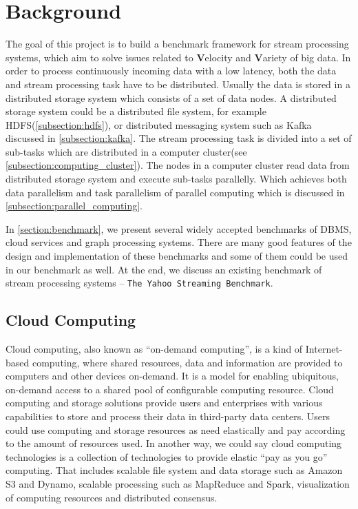 \chapter{Background}
The goal of this project is to build a benchmark framework for stream processing systems, which aim to solve issues related to \textbf{V}elocity and \textbf{V}ariety of big data\cite{GameChanger}. In order to process continuously incoming data with a low latency, both the data and stream processing task have to be distributed. Usually the data is stored in a distributed storage system which consists of a set of data nodes. A distributed storage system could be a distributed file system, for example HDFS(\cref{subsection:hdfs}), or distributed messaging system such as Kafka discussed in \cref{subsection:kafka}. The stream processing task is divided into a set of sub-tasks which are distributed in a computer cluster(see \cref{subsection:computing_cluster}). The nodes in a computer cluster read data from distributed storage system and execute sub-tasks parallelly. Which achieves both data parallelism and task parallelism of parallel computing which is discussed in \cref{subsection:parallel_computing}.
 
In \cref{section:benchmark}, we present several widely accepted benchmarks of DBMS, cloud services and graph processing systems. There are many good features of the design and implementation of these benchmarks and some of them could be used in our benchmark as well. At the end, we discuss an existing benchmark of stream processing systems -- \texttt{The Yahoo Streaming Benchmark}. 
 

\section{Cloud Computing}
Cloud computing, also known as ``on-demand computing'', is a kind of Internet-based computing, where shared resources, data and information are provided to computers and other devices on-demand. It is a model for enabling ubiquitous, on-demand access to a shared pool of configurable computing resource\cite{neto2011demystifying, mell2011nist}. Cloud computing and storage solutions provide users and enterprises with various capabilities to store and process their data in third-party data centers\cite{haghighat2015cloudid}. Users could use computing and storage resources as need elastically and pay according to the amount of resources used. In another way, we could say cloud computing technologies is a collection of technologies to provide elastic ``pay as you go'' computing. That includes scalable file system and data storage such as Amazon S3 and Dynamo, scalable processing such as MapReduce and Spark, visualization of computing resources and distributed consensus. 


